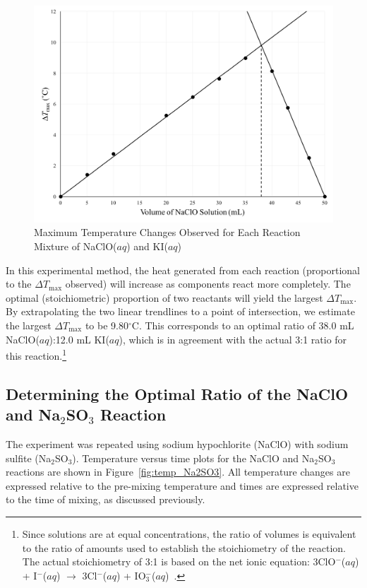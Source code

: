 \begin{figure}[htbp]
\centering
\includegraphics[width=\textwidth]{Bleach_KI_Variations_alt.png}
\caption{Maximum Temperature Changes Observed for Each Reaction Mixture of NaClO($aq$) and KI($aq$)}   %
\label{fig:var_KI}
\end{figure}

In this experimental method, the heat generated from each reaction (proportional to the $\Delta T_\mathrm{max}$ observed) 
will increase as components react more completely.  The optimal (stoichiometric) proportion of two reactants will yield the largest $\Delta T_\mathrm{max}$.  
By extrapolating the two linear trendlines to a point of intersection, we estimate the largest $\Delta T_\mathrm{max}$ to be 9.80$^\circ$C.  
This corresponds to an optimal ratio of 38.0 mL NaClO($aq$):12.0 mL KI($aq$), which is in agreement with the actual 3:1 ratio for this 
reaction.\footnote{Since solutions are at equal concentrations, the ratio of volumes is equivalent to the ratio of amounts used to establish the 
stoichiometry of the reaction.  The actual stoichiometry of 3:1 is based on the net ionic equation: 3ClO$^-$($aq$) + I$^-$($aq$) $\rightarrow$ 3Cl$^-$($aq$) + IO$_3^-$($aq$)~\cite{vonderbrink}.}

\subsection{Determining the Optimal Ratio of the NaClO and Na$_2$SO$_3$ Reaction}
The experiment was repeated using sodium hypochlorite (NaClO) with %
sodium sulfite (Na$_2$SO$_3$).  
Temperature versus time plots for the NaClO and Na$_2$SO$_3$ reactions are shown in Figure~\ref{fig:temp_Na2SO3}.  
All temperature changes are expressed relative to the pre-mixing temperature and times are expressed relative to 
the time of mixing, as discussed previously.  

